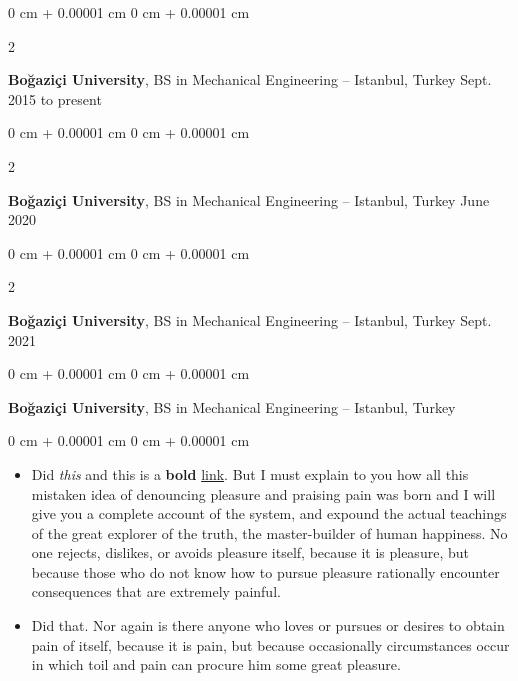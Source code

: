 \documentclass[10pt, letterpaper]{article}
\newenvironment{highlights}{
    \begin{itemize}[
        topsep=0.10 cm,
        parsep=0.10 cm,
        partopsep=0pt,
        itemsep=0pt,
        leftmargin=0 cm + 10pt
    ]
}{
    \end{itemize}
} %
\newenvironment{onecolentry}{
    \begin{adjustwidth}{
        0 cm + 0.00001 cm
    }{
        0 cm + 0.00001 cm
    }
}{
    \end{adjustwidth}
} %
\newenvironment{twocolentry}[2][]{
    \onecolentry
    \def\secondColumn{#2}
    \setcolumnwidth{\fill, 4.5 cm}
    \begin{paracol}{2}
}{
    \switchcolumn \raggedleft \secondColumn
    \end{paracol}
    \endonecolentry
} %
\begin{document}
        \vspace{0.2 cm}

        \begin{twocolentry}{
            Sept. 2015 to present
        }
            \textbf{Boğaziçi University}, BS in Mechanical Engineering -- Istanbul, Turkey\end{twocolentry}



        \vspace{0.2 cm}

        \begin{twocolentry}{
            June 2020
        }
            \textbf{Boğaziçi University}, BS in Mechanical Engineering -- Istanbul, Turkey\end{twocolentry}



        \vspace{0.2 cm}

        \begin{twocolentry}{
            Sept. 2021
        }
            \textbf{Boğaziçi University}, BS in Mechanical Engineering -- Istanbul, Turkey\end{twocolentry}



        \vspace{0.2 cm}

        \begin{onecolentry}
            \textbf{Boğaziçi University}, BS in Mechanical Engineering -- Istanbul, Turkey\end{onecolentry}

        \vspace{0.10 cm}
        \begin{onecolentry}
            \begin{highlights}
                \item Did \textit{this} and this is a \textbf{bold} \href{https://example.com}{link}. But I must explain to you how all this mistaken idea of denouncing pleasure and praising pain was born and I will give you a complete account of the system, and expound the actual teachings of the great explorer of the truth, the master-builder of human happiness. No one rejects, dislikes, or avoids pleasure itself, because it is pleasure, but because those who do not know how to pursue pleasure rationally encounter consequences that are extremely painful.
                \item Did that. Nor again is there anyone who loves or pursues or desires to obtain pain of itself, because it is pain, but because occasionally circumstances occur in which toil and pain can procure him some great pleasure.
            \end{highlights}
        \end{onecolentry}
\end{document}
